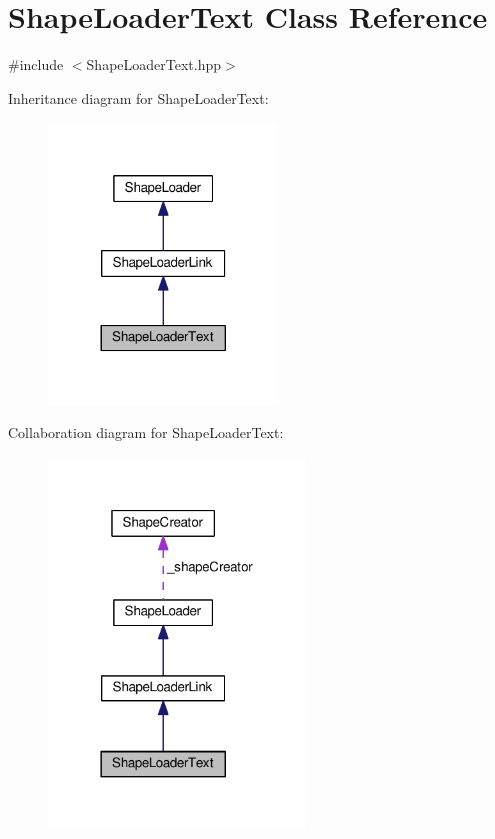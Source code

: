 \hypertarget{class_shape_loader_text}{}\section{Shape\+Loader\+Text Class Reference}
\label{class_shape_loader_text}


{\ttfamily \#include $<$Shape\+Loader\+Text.\+hpp$>$}



Inheritance diagram for Shape\+Loader\+Text\+:\nopagebreak
\begin{figure}[H]
\begin{center}
\leavevmode
\includegraphics[width=173pt]{class_shape_loader_text__inherit__graph}
\end{center}
\end{figure}


Collaboration diagram for Shape\+Loader\+Text\+:\nopagebreak
\begin{figure}[H]
\begin{center}
\leavevmode
\includegraphics[width=194pt]{class_shape_loader_text__coll__graph}
\end{center}
\end{figure}
